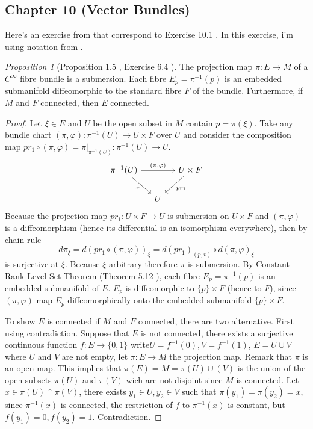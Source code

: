 \documentclass[a4paper]{article}
\theoremstyle{remark}
\newtheorem{prop}{Proposition}
\begin{document}
\subsection{Chapter 10 (Vector Bundles)}
Here's an exercise from \cite{LeeJeff} that correspond to Exercise 10.1 \cite{LeeSM}. In this exercise, i'm using notation from \cite{WPoor}.
\begin{prop}[Proposition 1.5 \cite{WPoor}, Exercise 6.4 \cite{LeeJeff}]
The projection map $\pi : E \to M$ of a $C^{\infty}$ fibre bundle is a submersion. Each fibre $E_p = \pi^{-1}(p)$ is an embedded submanifold diffeomorphic to the standard fibre $F$ of the bundle. Furthermore, if $M$ and $F$ connected, then $E$ connected.
\end{prop}
\begin{proof}
Let $\xi \in E$ and $U$ be the open subset in $M$ contain $p = \pi(\xi)$. Take any bundle chart $(\pi,\varphi) : \pi^{-1}(U) \to U\times F$ over $U$ and consider the composition map $pr_1 \circ (\pi,\varphi) = \pi|_{\pi^{-1}(U)} : \pi^{-1}(U) \to U $.
\[
\begin{tikzcd}[column sep=small]
\pi^{-1}(U) \arrow{rr}{(\pi,\varphi)} \arrow[swap]{dr}{\pi}& &U \times F \arrow{dl}{pr_1}\\
& U & 
\end{tikzcd}
\]
Because the projection map $pr_1 : U \times F \to U$ is submersion on $ U \times F$ and $(\pi,\varphi)$ is a diffeomorphism (hence its differential is an isomorphism everywhere), then by chain rule
$$
d\pi_{\xi} = d(pr_1 \circ (\pi,\varphi))_{\xi} = d(pr_1)_{(p,v)} \circ d(\pi,\varphi)_{\xi}
$$
is surjective at $\xi$. Because $\xi$ arbitrary therefore $\pi$ is submersion. By Constant-Rank Level Set Theorem (Theorem 5.12 \cite{LeeSM}), each fibre $E_p=\pi^{-1}(p)$ is an embedded submanifold of $E$.  $E_p$ is diffeomorphic to $\{p\} \times F$ (hence to $F$), since $(\pi,\varphi)$ map $E_p$ diffeomorphically onto the embedded submanifold $\{p\} \times F$.

To show $E$ is connected if $M$ and $F$ connected, there are two alternative. First using contradiction. Suppose that $E$ is not connected, there exists a surjective continuous function $f:E\rightarrow \{0,1\}$ write$U=f^{-1}(0), V=f^{-1}(1)$, $E=U\cup V$ where $U$ and $V$ are not empty, let $\pi:E\rightarrow M$ the projection map. Remark that $\pi$ is an open map. This implies that $\pi(E)=M=\pi(U)\cup (V)$ is the  union of the open subsets $\pi(U)$ and $\pi(V)$ wich are not disjoint since $M$ is connected. Let $x\in \pi(U)\cap \pi(V)$, there exists $y_1\in U, y_2\in V$ such that $\pi(y_1)=\pi(y_2)=x$, since $\pi^{-1}(x)$ is connected, the restriction of $f$ to $\pi^{-1}(x)$ is constant, but $f(y_1)=0, f(y_2)=1$. Contradiction. 


\end{proof}
\end{document}
